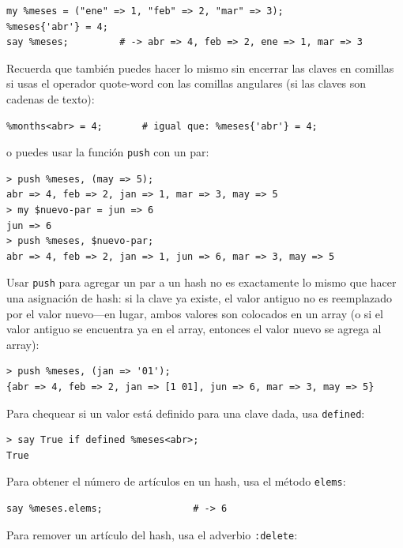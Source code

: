 \begin{lstlisting}
my %meses = ("ene" => 1, "feb" => 2, "mar" => 3);
%meses{'abr'} = 4;
say %meses;         # -> abr => 4, feb => 2, ene => 1, mar => 3
\end{lstlisting}

Recuerda que también puedes hacer lo mismo sin encerrar 
las claves en comillas si usas el operador quote-word con
las comillas angulares (si las claves son cadenas de texto):

\begin{lstlisting}
%months<abr> = 4;       # igual que: %meses{'abr'} = 4;
\end{lstlisting}

o puedes usar la función {\tt push} con un par:

\begin{lstlisting}
> push %meses, (may => 5);
abr => 4, feb => 2, jan => 1, mar => 3, may => 5
> my $nuevo-par = jun => 6
jun => 6
> push %meses, $nuevo-par;
abr => 4, feb => 2, jan => 1, jun => 6, mar => 3, may => 5
\end{lstlisting}
%

Usar {\tt push} para agregar un par a un hash no es exactamente lo
mismo que hacer una asignación de hash: si la clave ya existe,
el valor antiguo no es reemplazado por el valor nuevo---en lugar,
ambos valores son colocados en un array (o si el valor antiguo se 
encuentra ya en el array, entonces el valor nuevo se agrega al 
array):

\begin{lstlisting}
> push %meses, (jan => '01');
{abr => 4, feb => 2, jan => [1 01], jun => 6, mar => 3, may => 5}
\end{lstlisting}

Para chequear si un valor está definido para una clave dada,
usa {\tt defined}:

\begin{lstlisting}
> say True if defined %meses<abr>;
True
\end{lstlisting}
%

Para obtener el número de artículos en un hash, usa el 
método {\tt elems}:

\begin{lstlisting}
say %meses.elems;                # -> 6
\end{lstlisting}

Para remover un artículo del hash, usa el adverbio {\tt :delete}:

